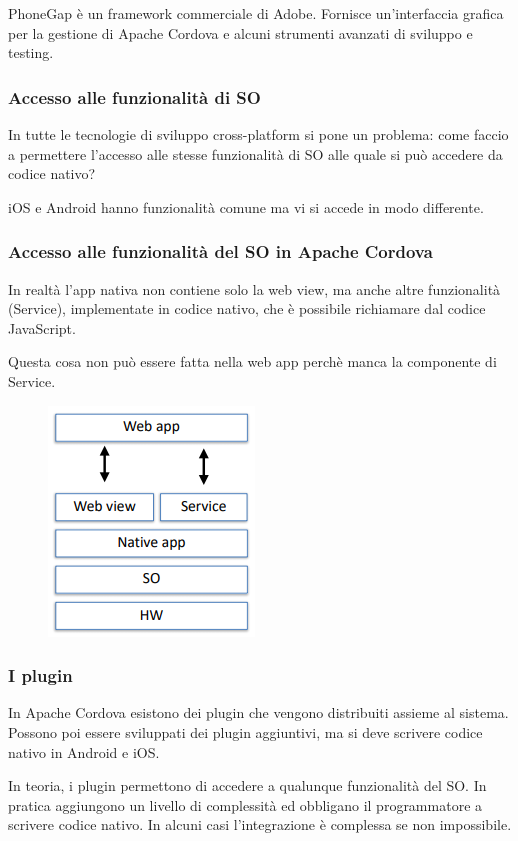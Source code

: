 PhoneGap è un framework commerciale di Adobe. 
Fornisce un'interfaccia grafica per la gestione di Apache Cordova e alcuni strumenti avanzati di sviluppo e testing. 

\subsubsection{Accesso alle funzionalità di SO}
In tutte le tecnologie di sviluppo cross-platform si pone un problema: come faccio a permettere l’accesso alle stesse funzionalità di SO alle quale si può accedere da codice nativo?

iOS e Android hanno funzionalità comune ma vi si accede in modo differente. 

\subsubsection{Accesso alle funzionalità del SO in Apache Cordova}
In realtà l’app nativa non contiene solo la web view, ma anche altre funzionalità (Service), implementate in codice nativo, che è possibile richiamare dal codice JavaScript. 

Questa cosa non può essere fatta nella web app perchè manca la componente di Service. 

\begin{figure}[!ht]
    \centering
    \includegraphics[width=.25\textwidth]{images/Mobile computing/7. Sviluppo/apache Cordova.PNG}
    \label{fig:apache Cordova}
\end{figure}

\subsubsection{I plugin}
In Apache Cordova esistono dei plugin che vengono distribuiti assieme al sistema. 
Possono poi essere sviluppati dei plugin aggiuntivi, ma si deve scrivere codice nativo in Android e iOS. 

In teoria, i plugin permettono di accedere a qualunque funzionalità del SO. In pratica aggiungono un livello di complessità ed obbligano il programmatore a scrivere codice nativo. In alcuni casi l'integrazione è complessa se non impossibile. 

